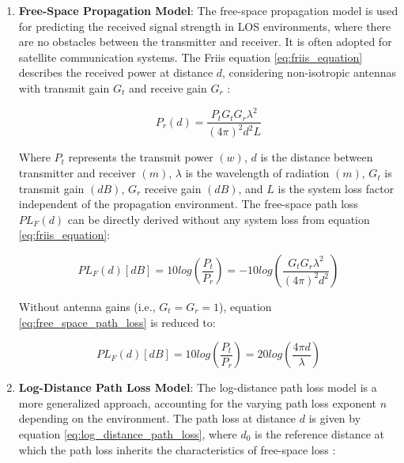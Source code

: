 \begin{enumerate}
    \item \textbf{Free-Space Propagation Model}: The free-space propagation model is used for predicting the received signal strength in \gls{LOS} environments, where there are no obstacles between the transmitter and receiver. It is often adopted for satellite communication systems. The Friis equation \ref{eq:friis_equation} describes the received power at distance $d$, considering non-isotropic antennas with transmit gain $G_t$ and receive gain $G_r$ \cite{cho2010mimo}:

    \begin{equation}\label{eq:friis_equation}
        P_r\left(d\right)=\frac{P_tG_tG_r\lambda^2}{\left(4\pi\right)^2d^2L}
    \end{equation}

    Where $P_t$ represents the transmit power $\left(w\right)$, $d$ is the distance between transmitter and receiver $\left(m\right)$, $\lambda$ is the wavelength of radiation $\left(m\right)$, $G_t$ is transmit gain $(dB)$, $G_r$ receive gain $(dB)$, and $L$ is the system loss factor independent of the propagation environment. The free-space path loss ${PL}_F\left(d\right)$ can be directly derived without any system loss from equation \ref{eq:friis_equation}:

    \begin{equation}\label{eq:free_space_path_loss}
        PL_F\left(d\right)\left[dB\right]=10log\left(\frac{P_t}{P_r}\right)=-10log\left(\frac{G_tG_r\lambda^2}{\left(4\pi\right)^2d^2}\right)
    \end{equation}

    Without antenna gains (i.e., $G_t=G_r=1$), equation \ref{eq:free_space_path_loss} is reduced to:

    \begin{equation}\label{eq:free_space_path_loss_no_antenna_gain}
        PL_F\left(d\right)\left[dB\right]=10log\left(\frac{P_t}{P_r}\right)=20log\left(\frac{4\pi d}{\lambda}\right)
    \end{equation}

    \item \textbf{Log-Distance Path Loss Model}: The log-distance path loss model is a more generalized approach, accounting for the varying path loss exponent $n$ depending on the environment. The path loss at distance $d$ is given by equation \ref{eq:log_distance_path_loss}, where $d_0$ is the reference distance at which the path loss inherits the characteristics of free-space loss \cite{cho2010mimo}:


\end{enumerate}
